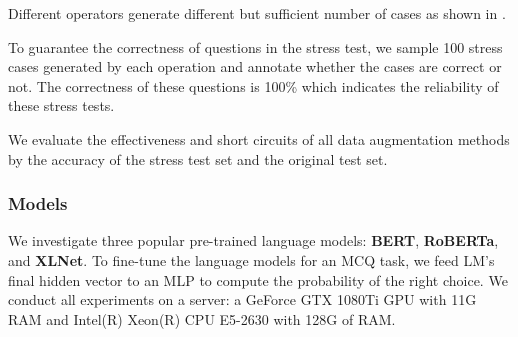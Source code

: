 Different operators generate different but sufficient number of cases 
as shown in .

To guarantee the correctness of questions in the stress test,
we sample 100 stress cases generated by each operation  
and annotate whether the cases are correct or not. The correctness of these 
questions is 100\% which indicates the reliability of these stress tests. 

We evaluate the effectiveness and short circuits of all data augmentation methods 
by the accuracy of the stress test set and the original test set.




\subsubsection{Models}
We investigate three popular pre-trained language models: \textbf{BERT}, \textbf{RoBERTa}, and \textbf{XLNet}. 
To fine-tune the language models for an MCQ task, we feed LM's final hidden
vector to an MLP to compute the probability of the right choice.
We conduct all experiments on a server: 
a GeForce GTX 1080Ti GPU with 11G RAM and Intel(R) Xeon(R) CPU E5-2630 with 128G of RAM.

